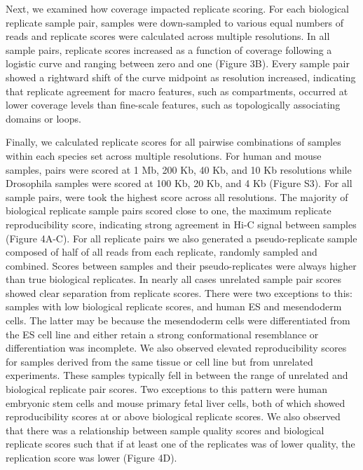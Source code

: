 
Next, we examined how coverage impacted replicate scoring. For each biological replicate sample pair, samples were down-sampled to various equal numbers of reads and replicate scores were calculated across multiple resolutions. In all sample pairs, replicate scores increased as a function of coverage following a logistic curve and ranging between zero and one (Figure 3B). Every sample pair showed a rightward shift of the curve midpoint as resolution increased, indicating that replicate agreement for macro features, such as compartments, occurred at lower coverage levels than fine-scale features, such as topologically associating domains or loops.

Finally, we calculated replicate scores for all pairwise combinations of samples within each species set across multiple resolutions. For human and mouse samples, pairs were scored at 1 Mb, 200 Kb, 40 Kb, and 10 Kb resolutions while Drosophila samples were scored at 100 Kb, 20 Kb, and 4 Kb (Figure S3). For all sample pairs, were took the highest score across all resolutions. The majority of biological replicate sample pairs scored close to one, the maximum replicate reproducibility score, indicating strong agreement in Hi-C signal between samples (Figure 4A-C). For all replicate pairs we also generated a pseudo-replicate sample composed of half of all reads from each replicate, randomly sampled and combined. Scores between samples and their pseudo-replicates were always higher than true biological replicates. In nearly all cases unrelated sample pair scores showed clear separation from replicate scores. There were two exceptions to this: samples with low biological replicate scores, and human ES and mesendoderm cells. The latter may be because the mesendoderm cells were differentiated from the ES cell line and either retain a strong conformational resemblance or differentiation was incomplete. We also observed elevated reproducibility scores for samples derived from the same tissue or cell line but from unrelated experiments. These samples typically fell in between the range of unrelated and biological replicate pair scores. Two exceptions to this pattern were human embryonic stem cells and mouse primary fetal liver cells, both of which showed reproducibility scores at or above biological replicate scores. We also observed that there was a relationship between sample quality scores and biological replicate scores such that if at least one of the replicates was of lower quality, the replication score was lower (Figure 4D).

